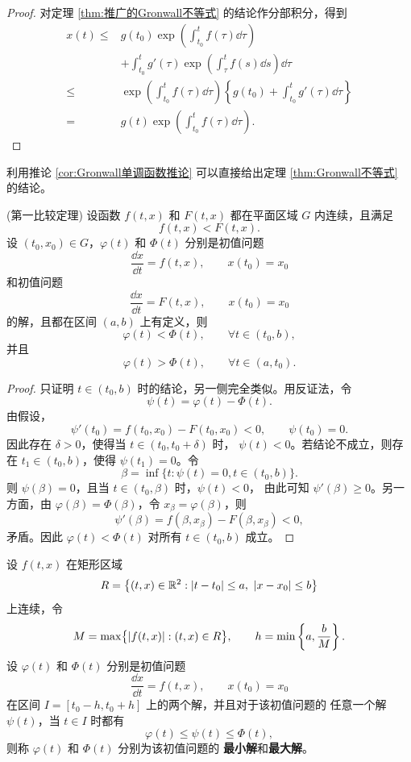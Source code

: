 \begin{proof}
	对定理 \ref{thm:推广的Gronwall不等式} 的结论作分部积分，得到
	\[
	\begin{aligned}
		x(t)\leq{}&g(t_0)
		\exp\left(\int_{t_0}^{t}f(\tau)\dd\tau\right)\\
		&+\int_{t_0}^{t}g'(\tau)
		\exp\left(\int_{\tau}^{t}f(s)\dd s\right)\dd\tau\\
		\leq{}&\exp\left(\int_{t_0}^{t}f(\tau)\dd\tau\right)
		\left\{g(t_0)+\int_{t_0}^{t}g'(\tau)\dd\tau\right\}\\
		={}&g(t)\exp\left(\int_{t_0}^{t}f(\tau)\dd\tau\right).
	\end{aligned}
	\]
\end{proof}

利用推论 \ref{cor:Gronwall单调函数推论} 可以直接给出定理
\ref{thm:Gronwall不等式} 的结论。

\begin{theorem}\label{thm:第一比较定理}(第一比较定理)
	设函数 $f(t,x)$ 和 $F(t,x)$ 都在平面区域 $G$ 内连续，且满足
	\[
		f(t,x)<F(t,x).
	\]
	设 $(t_0,x_0)\in G$，$\varphi(t)$ 和 $\Phi(t)$ 分别是初值问题
	\[
		\dfrac{\dd x}{\dd t}=f(t,x),
		\qquad x(t_0)=x_0
	\]
	和初值问题
	\[
		\dfrac{\dd x}{\dd t}=F(t,x),
		\qquad x(t_0)=x_0
	\]
	的解，且都在区间 $(a,b)$ 上有定义，则
	\[
		\varphi(t)<\Phi(t),
		\qquad \forall t\in(t_0,b),
	\]
	并且
	\[
		\varphi(t)>\Phi(t),
		\qquad \forall t\in(a,t_0).
	\]
\end{theorem}

\begin{proof}
	只证明 $t\in(t_0,b)$ 时的结论，另一侧完全类似。用反证法，令
	\[
		\psi(t)=\varphi(t)-\Phi(t).
	\]
	由假设，
	\[
		\psi'(t_0)=f(t_0,x_0)-F(t_0,x_0)<0,
		\qquad \psi(t_0)=0.
	\]
	因此存在 $\delta>0$，使得当 $t\in(t_0,t_0+\delta)$ 时，
	$\psi(t)<0$。若结论不成立，则存在 $t_1\in(t_0,b)$，使得
	$\psi(t_1)=0$。令
	\[
		\beta=\inf\bigl\{t:\psi(t)=0, t\in(t_0,b)\bigr\}.
	\]
	则 $\psi(\beta)=0$，且当 $t\in(t_0,\beta)$ 时，$\psi(t)<0$，
	由此可知 $\psi'(\beta)\geq0$。另一方面，由
	$\varphi(\beta)=\Phi(\beta)$，令 $x_\beta=\varphi(\beta)$，则
	\[
		\psi'(\beta)
		=f(\beta,x_\beta)-F(\beta,x_\beta)<0,
	\]
	矛盾。因此 $\varphi(t)<\Phi(t)$ 对所有 $t\in(t_0,b)$ 成立。
\end{proof}

\begin{definition}\label{def:最大解与最小解}
	设 $f(t,x)$ 在矩形区域
	\[
		R=\bigl\{(t,x)\in\mathbb{R}^2:
		\left| t-t_0 \right|\leq a,
		\ \left| x-x_0 \right|\leq b\bigr\}
	\]
	上连续，令
	\[
		M=\max\bigl\{\left| f(t,x) \right|:(t,x)\in R\bigr\},
		\qquad
		h=\min\left\{a,\dfrac{b}{M}\right\}.
	\]
	设 $\varphi(t)$ 和 $\Phi(t)$ 分别是初值问题
	\[
		\dfrac{\dd x}{\dd t}=f(t,x),
		\qquad x(t_0)=x_0
	\]
	在区间 $I=[t_0-h,t_0+h]$ 上的两个解，并且对于该初值问题的
	任意一个解 $\psi(t)$，当 $t\in I$ 时都有
	\[
		\varphi(t)\leq\psi(t)\leq\Phi(t),
	\]
	则称 $\varphi(t)$ 和 $\Phi(t)$ 分别为该初值问题的
	\textbf{最小解}和\textbf{最大解}。
\end{definition}


